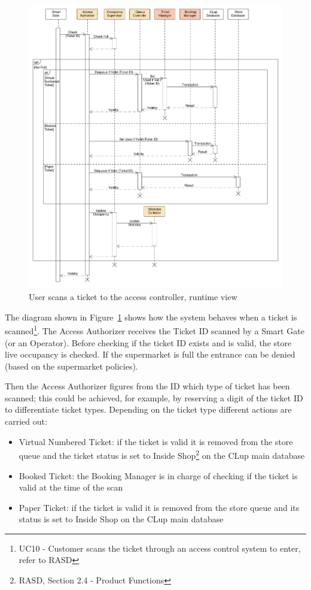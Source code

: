 \begin{figure}[H]
    \includegraphics[width=1.1\textwidth]{Images/UML_ticket_scan_sequence.pdf}
    \caption{\label{fig:UML_ticket_scan_sequence}User scans a ticket to the access controller, runtime view}
\end{figure}
The diagram shown in Figure~\ref{fig:UML_ticket_scan_sequence} shows how the system behaves when a ticket is scanned\footnote{UC10 - Customer scans the ticket through an access control system to enter, refer to RASD}. The Access Authorizer receives the Ticket ID scanned by a Smart Gate (or an Operator). Before checking if the ticket ID exists and is valid, the store live occupancy is checked. If the supermarket is full the entrance can be denied (based on the supermarket policies). 

Then the Access Authorizer figures from the ID which type of ticket has been scanned; this could be achieved, for example, by reserving a digit of the ticket ID to differentiate ticket types.
Depending on the ticket type different actions are carried out:
\begin{itemize}
    \item Virtual Numbered Ticket: if the ticket is valid it is removed from the store queue and the ticket status is set to Inside Shop\footnote{RASD, Section 2.4 - Product Functions} on the CLup main database
    \item Booked Ticket: the Booking Manager is in charge of checking if the ticket is valid at the time of the scan
    \item Paper Ticket: if the ticket is valid it is removed from the store queue and its status is set to Inside Shop on the CLup main database
\end{itemize}

